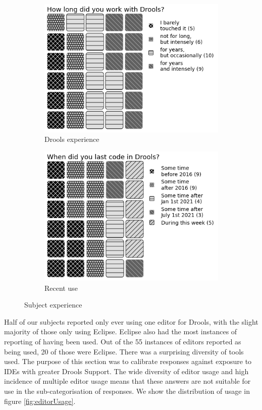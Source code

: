 \begin{figure}
    \begin{subfigure}{.33\textwidth}
      \centering
      \includegraphics[width=.95\linewidth]{Sections/images/pie_droolsExperience4.png}
      \caption{Drools experience}
      \label{fig:sfig2}
    \end{subfigure}
    \begin{subfigure}{.33\textwidth}
        \centering
        \includegraphics[width=.95\linewidth]{Sections/images/pie_recentusage4.png}
        \caption{Recent use}
        \label{fig:sfig3}
      \end{subfigure}
    \caption{Subject experience}
    \label{fig:subject_experience}
\end{figure}

Half of our subjects reported only ever using one editor for Drools, with the slight majority of those only using Eclipse.
Eclipse also had the most instances of reporting of having been used.
Out of the 55 instances of editors reported as being used, 20 of those were Eclipse.
There was a surprising diversity of tools used.
The purpose of this section was to calibrate responses against exposure to IDEs with greater Drools Support.
The wide diversity of editor usage and high incidence of multiple editor usage means that these answers are not suitable for use in the sub-categorisation of responses. 
We show the distribution of usage in figure \ref{fig:editorUsage}.

